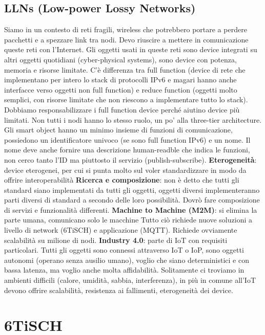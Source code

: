 \documentclass[12pt,italian]{report}
\begin{document}
\section{LLNs (Low-power Lossy Networks)}
Siamo in un contesto di reti fragili, wireless che potrebbero portare a perdere pacchetti e a spezzare link tra nodi. Devo riuscire a mettere in comunicazione queste reti con l'Internet. Gli oggetti usati in queste reti sono device integrati su altri oggetti quotidiani (cyber-physical systems), sono device con potenza, memoria e risorse limitate. 
\bigbreak
C'è differenza tra full function (device di rete che implementano per intero lo stack di protocolli IPv6 e magari hanno anche interfacce verso oggetti non full function) e reduce function (oggetti molto semplici, con risorse limitate che non riescono a implementare tutto lo stack). Dobbiamo responsabilizzare i full function device perché aiutino device più limitati. Non tutti i nodi hanno lo stesso ruolo, un po' alla three-tier architecture. 
\bigbreak
Gli smart object hanno un minimo insieme di funzioni di comunicazione, possiedono un identificatore univoco (se sono full function IPv6) e un nome. Il nome deve anche fornire una descrizione human-readble che indica le funzioni, non cerco tanto l'ID ma piuttosto il servizio (publish-subscribe). 
\bigbreak
\noindent \textbf{Eterogeneità}: device eterogenei, per cui si punta molto sul voler standardizzare in modo da offrire interoperabilità
\bigbreak 
\noindent \textbf{Ricerca e composizione}: non è detto che tutti gli standard siano implementati da tutti gli oggetti, oggetti diversi implementeranno parti diversi di standard a secondo delle loro possibilità. Dovrò fare composizione di servizi e funzionalità differenti.
\bigbreak
\noindent \textbf{Machine to Machine (M2M)}: si elimina la parte umana, comunicano solo le macchine
\bigbreak
Tutto ciò richiede nuove soluzioni a livello di network (6TiSCH) e applicazione (MQTT). Richiede ovviamente scalabilità su milione di nodi.
\bigbreak
\noindent \textbf{Industry 4.0}: parte di IoT con requisiti particolari. Tutti gli oggetti sono connessi attraverso IoT o IoP, sono oggetti autonomi (operano senza ausilio umano), voglio che siano deterministici e con bassa latenza, ma voglio anche molta affidabilità. Solitamente ci troviamo in ambienti difficili (calore, umidità, sabbia, interferenza), in più in comune all'IoT devono offrire scalabilità, resistenza ai fallimenti, eterogeneità dei device. 

\chapter{6TiSCH}
\end{document}
